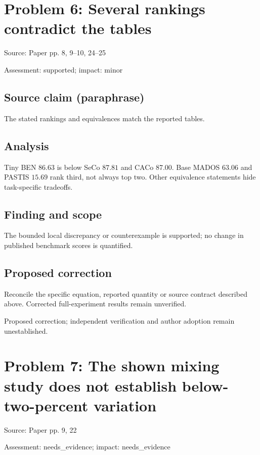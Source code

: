 \documentclass[11pt]{article}
\begin{document}
\section*{Problem 6: Several rankings contradict the tables}

Source: Paper pp. 8, 9–10, 24–25

Assessment: supported; impact: minor

\subsection*{Source claim (paraphrase)}

The stated rankings and equivalences match the reported tables.

\subsection*{Analysis}

Tiny BEN \(86.63\) is below SeCo \(87.81\) and CACo 87.00. Base MADOS \(63.06\) and PASTIS \(15.69\) rank third, not always top two. Other equivalence statements hide task-specific tradeoffs.

\subsection*{Finding and scope}

The bounded local discrepancy or counterexample is supported; no change in published benchmark scores is quantified.

\subsection*{Proposed correction}

Reconcile the specific equation, reported quantity or source contract described above. Corrected full-experiment results remain unverified.

Proposed correction; independent verification and author adoption remain unestablished.

\section*{Problem 7: The shown mixing study does not establish below-two-percent variation}

Source: Paper pp. 9, 22

Assessment: needs\_evidence; impact: needs\_evidence
\end{document}
